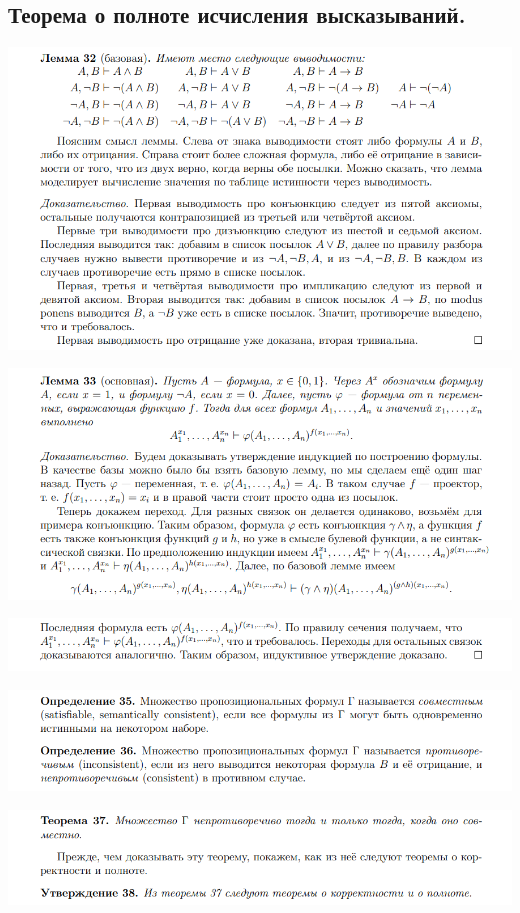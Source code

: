 \subsection{Теорема о полноте исчисления высказываний.}

\includegraphics[width=0.93\linewidth]{images/lem_1_base.png}

\includegraphics[width=0.93\linewidth]{images/lem_2_main_1.png}

\includegraphics[width=0.93\linewidth]{images/lem_2_main_2.png}

\includegraphics[width=0.93\linewidth]{images/def_for_proof_1.png}

\includegraphics[width=0.93\linewidth]{images/th_main_for_full.png}

